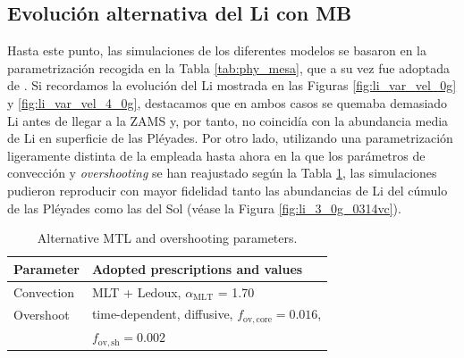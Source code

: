 \subsection{Evolución alternativa del Li con MB}
Hasta este punto, las simulaciones de los diferentes modelos se basaron en la parametrización recogida en la Tabla \ref{tab:phy_mesa}, que a su vez fue adoptada de \cite{Choi2016}. Si recordamos la evolución del Li mostrada en las Figuras \ref{fig:li_var_vel_0g} y \ref{fig:li_var_vel_4_0g}, destacamos que en ambos casos se quemaba demasiado Li antes de llegar a la ZAMS y, por tanto, no coincidía con la abundancia media de Li en superficie de las Pléyades. Por otro lado, utilizando una parametrización ligeramente distinta de la empleada hasta ahora en la que los parámetros de convección y \textit{overshooting} se han reajustado según la Tabla \ref{tab:phy_alt_mesa}, las simulaciones pudieron reproducir con mayor fidelidad tanto las abundancias de Li del cúmulo de las Pléyades como las del Sol (véase la Figura \ref{fig:li_3_0g_0314vc}).\par

\begin{table}
	\centering
	\caption{Alternative MTL and overshooting parameters.}
	\label{tab:phy_alt_mesa}
	\begin{tabular}{ll} 
		\hline
		Parameter & Adopted prescriptions and values\\
		\hline
		Convection & MLT + Ledoux, $\alpha_\mathrm{MLT}$ = 1.70\\
		Overshoot & time-dependent, diffusive, $f_\mathrm{ov,core}=0.016$, \\ & $f_\mathrm{ov,sh}=0.002$\\
		\hline
	\end{tabular}
\end{table}

